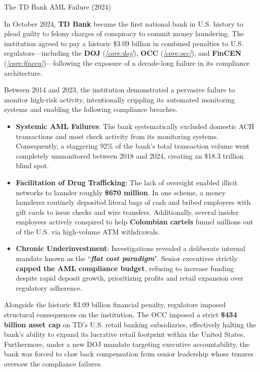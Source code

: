 \documentclass[10pt]{article}
\begin{document}
    \begin{core}[label=core:td_bank_aml]{The TD Bank AML Failure (2024)}

      In October 2024, \textbf{TD Bank} became the first national bank in U.S. history to plead guilty to felony charges of conspiracy to commit money laundering. The institution agreed to pay a historic \$3.09 billion in combined penalties to U.S. regulators---including the \textbf{DOJ} (\textit{\autoref{core:doj}}), \textbf{OCC} (\textit{\autoref{core:occ}}), and \textbf{FinCEN} (\textit{\autoref{core:fincen}})---following the exposure of a decade-long failure in its compliance architecture.

      Between 2014 and 2023, the institution demonstrated a pervasive failure to monitor high-risk activity, intentionally crippling its automated monitoring systems and enabling the following compliance breaches.

      \begin{itemize}

        \item \textbf{Systemic AML Failures}: The bank systematically excluded domestic ACH transactions and most check activity from its monitoring systems. Consequently, a staggering 92\% of the bank's total transaction volume went completely unmonitored between 2018 and 2024, creating an \$18.3 trillion blind spot.

        \item \textbf{Facilitation of Drug Trafficking}: The lack of oversight enabled illicit networks to launder roughly \textbf{\$670 million}. In one scheme, a money launderer routinely deposited literal bags of cash and bribed employees with gift cards to issue checks and wire transfers. Additionally, several insider employees actively conspired to help \textbf{Colombian cartels} funnel millions out of the U.S. via high-volume ATM withdrawals.

        \item \textbf{Chronic Underinvestment}: Investigations revealed a deliberate internal mandate known as the ``\textbf{\textit{flat cost paradigm}}". Senior executives strictly \textbf{capped the AML compliance budget}, refusing to increase funding despite rapid deposit growth, prioritizing profits and retail expansion over regulatory adherence.

      \end{itemize}

      Alongside the historic \$3.09 billion financial penalty, regulators imposed structural consequences on the institution. The OCC imposed a strict \textbf{\$434 billion asset cap} on TD's U.S. retail banking subsidiaries, effectively halting the bank's ability to expand its lucrative retail footprint within the United States. Furthermore, under a new DOJ mandate targeting executive accountability, the bank was forced to claw back compensation from senior leadership whose tenures oversaw the compliance failures.


\end{core}
\end{document}
